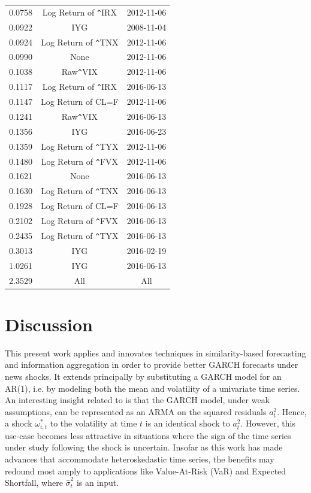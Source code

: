 \documentclass{uiucthesis2021}
\theoremstyle{definition}
\begin{document}
\begin{table}[ht]
\begin{tabular}{ccc}
      0.0758 & Log Return of \verb|^|IRX & 2012-11-06 \\ 
      0.0922 & IYG & 2008-11-04 \\ 
      0.0924 & Log Return of \verb|^|TNX & 2012-11-06 \\ 
      0.0990 & None & 2012-11-06 \\ 
      0.1038 & Raw\verb|^|VIX & 2012-11-06 \\ 
      0.1117 & Log Return of \verb|^|IRX & 2016-06-13 \\ 
      0.1147 & Log Return of CL=F & 2012-11-06 \\ 
      0.1241 & Raw\verb|^|VIX & 2016-06-13 \\ 
      0.1356 & IYG & 2016-06-23 \\ 
      0.1359 & Log Return of \verb|^|TYX & 2012-11-06 \\ 
      0.1480 & Log Return of \verb|^|FVX & 2012-11-06 \\ 
      0.1621 & None & 2016-06-13 \\ 
      0.1630 & Log Return of \verb|^|TNX & 2016-06-13 \\ 
      0.1928 & Log Return of CL=F & 2016-06-13 \\ 
      0.2102 & Log Return of \verb|^|FVX & 2016-06-13 \\ 
      0.2435 & Log Return of \verb|^|TYX & 2016-06-13 \\ 
      0.3013 & IYG & 2016-02-19 \\ 
      1.0261 & IYG & 2016-06-13 \\
      \rowcolor{red} 2.3529 & All & All \\ 
       \hline
    \end{tabular}
    \endgroup
    \end{table}\label{multiverse_table}

\section{Discussion}

This present work applies and innovates techniques in similarity-based forecasting and information aggregation in order to provide better GARCH forecasts under news shocks.  It extends \citet{lin2021minimizing} principally by substituting a GARCH model for an AR(1), i.e. by modeling both the mean and volatility of a univariate time series.  An interesting insight related to \citet{lin2021minimizing} is that the GARCH model, under weak assumptions, can be represented as an ARMA on the squared residuals $a^{2}_{t}$.  Hence, a shock $\omega^{*}_{i,t}$ to the volatility at time $t$ is an identical shock to $a^{2}_{t}$. However, this use-case becomes less attractive in situations where the sign of the time series under study following the shock is uncertain.  Insofar as this work has made advances that accommodate heteroskedastic time series, the benefits may redound most amply to applications like Value-At-Risk (VaR) and Expected Shortfall, where $\hat\sigma^{2}_{t}$ is an input.
\end{document}
